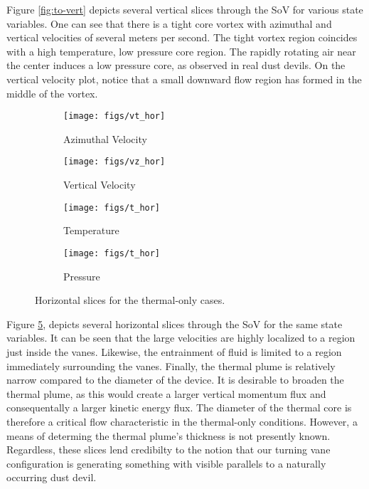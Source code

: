 %
%
%
Figure \ref{fig:to-vert} depicts several vertical slices through the SoV
for various state variables. One can see that there is a tight core
vortex with azimuthal and vertical velocities of several meters per
second. The tight vortex region coincides with a high temperature, low
pressure core region. The rapidly rotating air near the center induces
a low pressure core, as observed in real dust devils.
On the vertical velocity plot, notice that a small
downward flow region has formed in the middle of the vortex. 

\begin{figure}[htb]

 \begin{subfigure}{.5\textwidth}
  \centering
  \texttt{[image: figs/vt\_hor]}
  \caption{Azimuthal Velocity}
  \label{fig:vt-to}
 \end{subfigure}%
 \begin{subfigure}{.5\textwidth}
  \centering
  \texttt{[image: figs/vz\_hor]}
  \caption{Vertical Velocity}
  \label{fig:vz-to}
 \end{subfigure}%


 \begin{subfigure}{.5\textwidth}
  \centering
  \texttt{[image: figs/t\_hor]}
  \caption{Temperature}
  \label{fig:t-to}
 \end{subfigure}%
 \begin{subfigure}{.5\textwidth}
  \centering
  \texttt{[image: figs/t\_hor]}
  \caption{Pressure}
  \label{fig:p-to}
 \end{subfigure}%

 \caption{Horizontal slices for the thermal-only cases.}
 \label{fig:to-hor}
\end{figure}

Figure \ref{fig:to-hor}, depicts several horizontal slices
through the SoV for the same state variables. It can be seen that the
large velocities are highly localized to a region just inside the
vanes. Likewise, the entrainment of fluid is limited to a region
immediately surrounding the vanes. 
%
%
Finally, the thermal plume is relatively
narrow compared to the diameter of the device. It is desirable to
broaden the thermal plume, as this would create a larger vertical
momentum flux and consequentally a larger kinetic energy flux. 
The diameter of the thermal core is
therefore a critical flow characteristic in the thermal-only
conditions. However, a means of determing the thermal plume's thickness 
is not presently known. Regardless, these slices lend credibilty to the
notion that our turning vane configuration is generating something with
visible parallels to a naturally occurring dust devil.   

